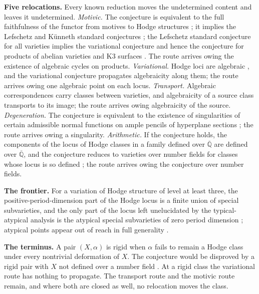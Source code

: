 \documentclass[10pt,twocolumn]{article}
\begin{document}
\textbf{Five relocations.} Every known reduction moves the undetermined
content and leaves it undetermined. \emph{Motivic.} The conjecture is
equivalent to the full faithfulness of the functor from motives to Hodge
structures \cite{deligne2006}; it implies the Lefschetz and Künneth
standard conjectures \cite{kleiman1968}; the Lefschetz standard
conjecture for all varieties implies the variational conjecture and
hence the conjecture for products of abelian varieties and K3 surfaces
\cite{andre1996}. The route arrives owing the existence of algebraic
cycles on products. \emph{Variational.} Hodge loci are algebraic
\cite{cdk1995}, and the variational conjecture propagates algebraicity
along them; the route arrives owing one algebraic point on each locus.
\emph{Transport.} Algebraic correspondences carry classes between
varieties, and algebraicity of a source class transports to its image;
the route arrives owing algebraicity of the source. \emph{Degeneration.}
The conjecture is equivalent to the existence of singularities of
certain admissible normal functions on ample pencils of hyperplane
sections \cite{gg2007,thomas2005,bfnp2009}; the route arrives owing a
singularity. \emph{Arithmetic.} If the conjecture holds, the components
of the locus of Hodge classes in a family defined over
\(\overline{\mathbb{Q}}\) are defined over \(\overline{\mathbb{Q}}\),
and the conjecture reduces to varieties over number fields for classes
whose locus is so defined \cite{voisin2007}; the route arrives owing the
conjecture over number fields.

\textbf{The frontier.} For a variation of Hodge structure of level at
least three, the positive-period-dimension part of the Hodge locus is a
finite union of special subvarieties, and the only part of the locus
left unelucidated by the typical-atypical analysis is the atypical
special subvarieties of zero period dimension \cite{bku2024}; atypical
points appear out of reach in full generality \cite{ku2024}.

\textbf{The terminus.} A pair \((X,\alpha)\) is rigid when \(\alpha\)
fails to remain a Hodge class under every nontrivial deformation of
\(X\). The conjecture would be disproved by a rigid pair with \(X\) not
defined over a number field \cite{voisin2016}. At a rigid class the
variational route has nothing to propagate. The transport route and the
motivic route remain, and where both are closed as well, no relocation
moves the class.
\end{document}
